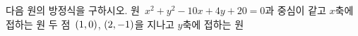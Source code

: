 다음 원의 방정식을 구하시오.
 원~$x^2+y^2-10x+4y+20=0$과 중심이 같고 $x$축에 접하는 원
 두 점~$(1{,}\mkern3mu\mathopen{}0)$, $(2{,}\mkern3mu\mathopen{}-1)$을 지나고 $y$축에 접하는 원
